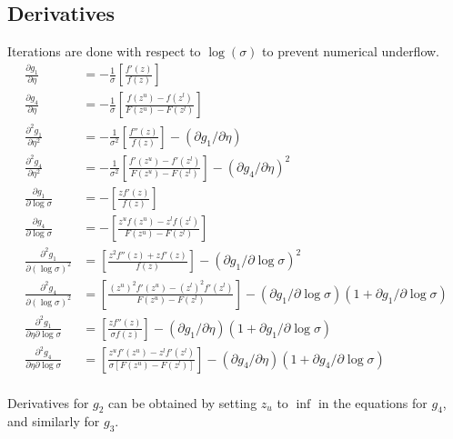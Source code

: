 \documentclass[12pt,a4paper]{report}
\begin{document}
\subsection*{Derivatives}
Iterations are done with respect to $\log(\sigma)$ to prevent numerical underflow.
\begin{equation}
\begin{split}
\frac{\partial g_1}{\partial \eta} & = - \frac{1}{\sigma} \left [ \frac{f'(z)}{f(z)} \right ] \\
\frac{\partial g_4}{\partial \eta} & = - \frac{1}{\sigma} \left [ \frac{f(z^u) - f(z^l)} {F(z^u) - F(z^l)} \right ] \\
\frac{\partial^2 g_1}{\partial \eta^2} & = - \frac{1}{\sigma^2} \left [ \frac{f''(z)}{f(z)} \right ] - \left ({\partial g_1}/{\partial \eta} \right ) \\
\frac{\partial^2 g_4}{\partial \eta^2} & = - \frac{1}{\sigma^2} \left [ \frac{f'(z^u) - f'(z^l)} {F(z^u) - F(z^l)} \right ] - \left ({\partial g_4}/{\partial \eta} \right )^2 \\
\frac{\partial g_1}{\partial \log \sigma} & = - \left [ \frac{z f'(z)}{f(z)} \right ] \\
\frac{\partial g_4}{\partial \log \sigma} & = - \left [ \frac{z^u f(z^u) - z^l f(z^l)} {F(z^u) - F(z^l)} \right ] \\
\frac{\partial^2 g_1}{\partial (\log \sigma )^2} & = \left [ \frac{z^2 f''(z) + z f'(z)}{f(z)} \right ] - \left ({\partial g_1}/{\partial \log \sigma } \right )^2 \\
\frac{\partial^2 g_4}{\partial (\log \sigma )^2} & = \left [ \frac{(z^u )^2 f'(z^u) - (z^l )^2 f'(z^l)} {F(z^u) - F(z^l)} \right ] - (\partial g_1 / \partial \log \sigma) (1 + \partial g_1 / \partial \log \sigma ) \\
\frac{\partial^2 g_1}{\partial \eta \partial \log \sigma} & = \left [\frac{z f''(z)} {\sigma f(z)} \right ] - (\partial g_1 / \partial \eta) (1 + \partial g_1 / \partial \log \sigma ) \\
\frac{\partial^2 g_4}{\partial \eta \partial \log \sigma} & = \left [\frac{z^u f'(z^u ) - z^l f'(z^l)} {\sigma [F(z^u) - F(z^l)]} \right ] - (\partial g_4 / \partial \eta) (1 + \partial g_4 / \partial \log \sigma ) \\
\end{split}  		%
\end{equation}

Derivatives for $g_2$ can be obtained by setting $z_u$ to $\inf$ in the equations for $g_4$, and similarly for $g_3$.
\end{document}
